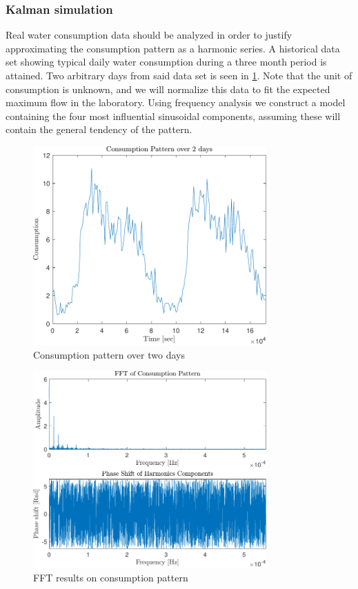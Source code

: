 \subsubsection{Kalman simulation}
Real water consumption data should be analyzed in order to justify approximating the consumption pattern as a harmonic series. A historical data set showing typical daily water consumption during a three month period is attained. Two arbitrary days from said data set is seen in \cref{fig:Consumptionpattern}. Note that the unit of consumption is unknown, and we will normalize this data to fit the expected maximum flow in the laboratory.  Using frequency analysis we construct a model containing the four most influential sinusoidal components, assuming these will contain the general tendency of the pattern.

\begin{figure}[h!]
	\centering
	\includegraphics[width=0.8\textwidth]{Pictures/ConsumptionPattern.pdf}
	
	\caption{Consumption pattern over two days}
	\label{fig:Consumptionpattern}
\end{figure}

\begin{figure}[h!]
	\centering
	\includegraphics[width=0.8\textwidth]{Pictures/FFT.pdf}
	
	\caption{FFT results on consumption pattern}
	\label{fig:FFT}
\end{figure}

